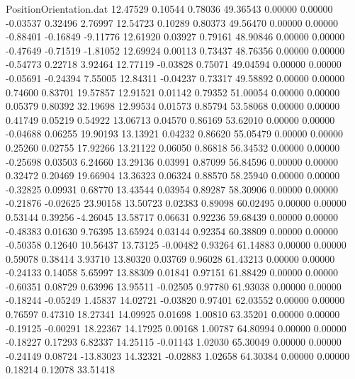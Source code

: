 \begin{filecontents}{PositionOrientation.dat}
  12.47529    0.10544    0.78036    49.36543    0.00000    0.00000   -0.03537    0.32496    2.76997
  12.54723    0.10289    0.80373    49.56470    0.00000    0.00000   -0.88401   -0.16849   -9.11776
  12.61920    0.03927    0.79161    48.90846    0.00000    0.00000   -0.47649   -0.71519   -1.81052
  12.69924    0.00113    0.73437    48.76356    0.00000    0.00000   -0.54773    0.22718    3.92464
  12.77119   -0.03828    0.75071    49.04594    0.00000    0.00000   -0.05691   -0.24394    7.55005
  12.84311   -0.04237    0.73317    49.58892    0.00000    0.00000    0.74600    0.83701   19.57857
  12.91521    0.01142    0.79352    51.00054    0.00000    0.00000    0.05379    0.80392   32.19698
  12.99534    0.01573    0.85794    53.58068    0.00000    0.00000    0.41749    0.05219    0.54922
  13.06713    0.04570    0.86169    53.62010    0.00000    0.00000   -0.04688    0.06255   19.90193
  13.13921    0.04232    0.86620    55.05479    0.00000    0.00000    0.25260    0.02755   17.92266
  13.21122    0.06050    0.86818    56.34532    0.00000    0.00000   -0.25698    0.03503    6.24660
  13.29136    0.03991    0.87099    56.84596    0.00000    0.00000    0.32472    0.20469   19.66904
  13.36323    0.06324    0.88570    58.25940    0.00000    0.00000   -0.32825    0.09931    0.68770
  13.43544    0.03954    0.89287    58.30906    0.00000    0.00000   -0.21876   -0.02625   23.90158
  13.50723    0.02383    0.89098    60.02495    0.00000    0.00000    0.53144    0.39256   -4.26045
  13.58717    0.06631    0.92236    59.68439    0.00000    0.00000   -0.48383    0.01630    9.76395
  13.65924    0.03144    0.92354    60.38809    0.00000    0.00000   -0.50358    0.12640   10.56437
  13.73125   -0.00482    0.93264    61.14883    0.00000    0.00000    0.59078    0.38414    3.93710
  13.80320    0.03769    0.96028    61.43213    0.00000    0.00000   -0.24133    0.14058    5.65997
  13.88309    0.01841    0.97151    61.88429    0.00000    0.00000   -0.60351    0.08729    0.63996
  13.95511   -0.02505    0.97780    61.93038    0.00000    0.00000   -0.18244   -0.05249    1.45837
  14.02721   -0.03820    0.97401    62.03552    0.00000    0.00000    0.76597    0.47310   18.27341
  14.09925    0.01698    1.00810    63.35201    0.00000    0.00000   -0.19125   -0.00291   18.22367
  14.17925    0.00168    1.00787    64.80994    0.00000    0.00000   -0.18227    0.17293    6.82337
  14.25115   -0.01143    1.02030    65.30049    0.00000    0.00000   -0.24149    0.08724  -13.83023
  14.32321   -0.02883    1.02658    64.30384    0.00000    0.00000    0.18214    0.12078   33.51418

\end{filecontents}

